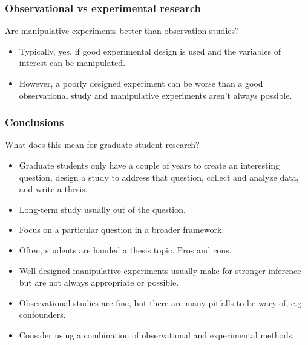 \documentclass[color=usenames,dvipsnames]{beamer}\usepackage[]{graphicx}\usepackage[]{xcolor}
\begin{document}
\begin{frame}
  \frametitle{Observational vs experimental research}
  Are manipulative experiments better than observation studies? \\
  \begin{itemize}
    \item Typically, yes, if good experimental design is used and the
      variables of interest can be manipulated.
    \item However, a poorly designed experiment can be worse than a good
      observational study and manipulative experiments aren't always
      possible. 
  \end{itemize}
\end{frame}


\begin{frame}
  \frametitle{Conclusions}
  What does this mean for graduate student research?
  \begin{itemize}[<+->]
    \item Graduate students only have a couple of years to create an
      interesting question, design a study to address that question,
      collect and analyze data, and write a thesis.
    \item Long-term study usually out of the question.
    \item Focus on a particular question in a broader framework.
    \item Often, students are handed a thesis topic. Pros and cons.
    \item Well-designed manipulative experiments usually make for
      stronger inference but are not always appropriate or possible. 
    \item Observational studies are fine, but there are many pitfalls
      to be wary of, e.g. confounders.
    \item Consider using a combination of observational and
      experimental methods.
  \end{itemize}
\end{frame}
\end{document}
